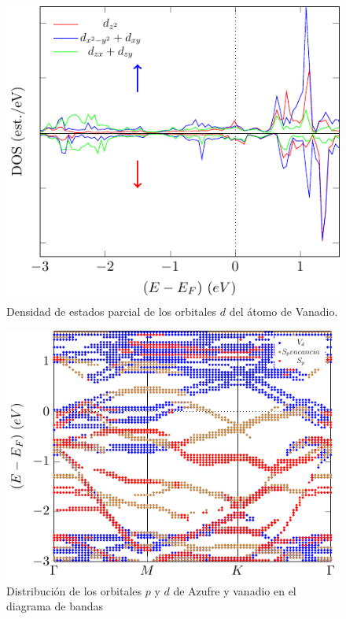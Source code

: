 \begin{figure}[!hbt]
	\centering
	\includegraphics[scale=1]{figRes/VSe2/def/bandas/nosoc/pdosV.pdf}
	\caption[Densidad de estados parcial de los orbitales $d$ del \'atomo de vanadio en VSe\textsubscript{2} con vacancia de vanadio]{Densidad de estados parcial de los orbitales $d$ del \'atomo de Vanadio.}
	\label{Sim:fig:pdosVVse2}
\end{figure} 
\newline
\begin{figure}[!hbt]
	\centering
	\includegraphics[scale=1]{figRes/VS2/def/bandas/nosoc/bandasSe.pdf}
	\caption[Distribuci\'on de los orbitales de los \'atomos en el diagrama de bandas del VS\textsubscript{2} con vacancia de Vanadio]{Distribuci\'on de los orbitales $p$ y $d$ de Azufre y vanadio en el diagrama de bandas}
	\label{Sim:fig:orbVacVS2bandas}
\end{figure}
